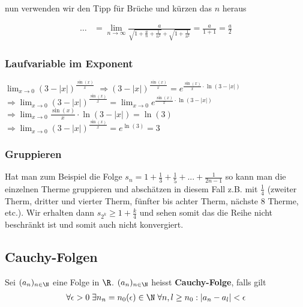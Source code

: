 nun verwenden wir den Tipp für Brüche und kürzen das $n$ heraus

\begin{align*}
\ldots &= \lim_{n \to \infty} \frac{a}{\sqrt{1 + \frac{a}{n} + \frac{1}{n^2}} +
\sqrt{1 + \frac{1}{n^2}}} = \frac{a}{1 + 1} = \frac{a}{2}
\end{align*}


\subsubsection{Laufvariable im Exponent}
$\lim_{x \to 0} (3 - |x|)^{\frac{\sin(x)}{x}}$\newline
$\Rightarrow (3 - |x|)^{\frac{\sin(x)}{x}} = e^{\frac{\sin(x)}{x} \cdot \ln(3 -
|x|)}$\newline
$\Rightarrow 
\lim_{x \to 0} (3 - |x|)^{\frac{\sin(x)}{x}} = \lim_{x \to 0}e^{\frac{\sin(x)}{x} \cdot \ln(3 -
|x|)}$\newline
$\Rightarrow \lim_{x \to 0}\frac{\sin(x)}{x}\cdot \ln(3-|x|) = \ln(3)$\newline
$\Rightarrow \lim_{x \to 0}(3 - |x|)^{\frac{\sin(x)}{x}} = e^{\ln(3)} = 3$


\subsubsection{Gruppieren}
Hat man zum Beispiel die Folge $s_n = 1 + \frac{1}{3} + \frac{1}{5} + ... + \frac{1}{2n-1}$ so kann man die 
einzelnen Therme gruppieren und abschätzen in diesem Fall z.B. mit $\frac{1}{4}$ (zweiter Therm, dritter und vierter Therm,
fünfter bis achter Therm, nächste 8 Therme, etc.). Wir erhalten dann $s_{2^k} \geq 1 + \frac{k}{4}$ und sehen somit das die 
Reihe nicht beschränkt ist und somit auch nicht konvergiert.

\subsection{Cauchy-Folgen}
\begin{definition}
Sei $(a_n)_{n \in \N}$ eine Folge in $\R$. $(a_n)_{n \in \N}$ heisst \textbf{Cauchy-Folge}, falls gilt
\begin{align*}
\forall \epsilon > 0 \; \exists n_n = n_0(\epsilon) \in \N \; \forall n, l \geq n_0: |a_n - a_l| < \epsilon
\end{align*}
\end{definition}

